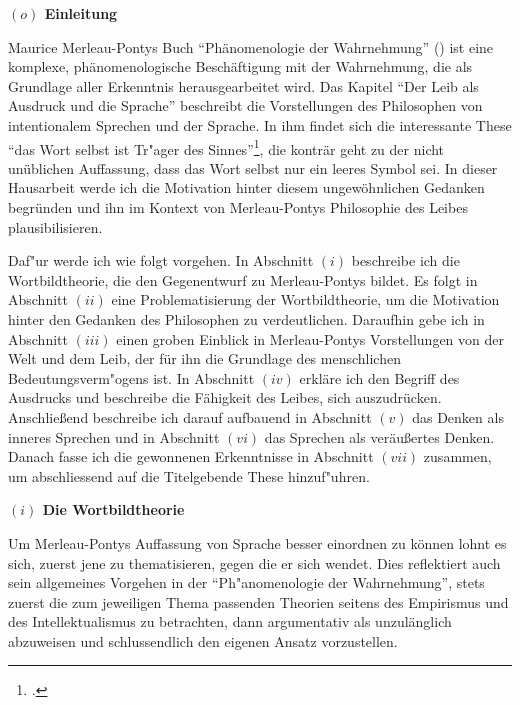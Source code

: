 \documentclass[a4paper, 12pt]{article}
\begin{document}
\begin{onehalfspace} 

\noindent\textbf{$(o)$ Einleitung}

\noindent Maurice Merleau-Pontys Buch "`Phänomenologie der Wahrnehmung"' (\Cite{merleau1966phanomenologie}) ist eine komplexe, phänomenologische Beschäftigung mit der Wahrnehmung, die als Grundlage aller Erkenntnis herausgearbeitet wird. Das Kapitel "`Der Leib als Ausdruck und die Sprache"' beschreibt die Vorstellungen des Philosophen von intentionalem Sprechen und der Sprache. In ihm findet sich die interessante These "`das Wort selbst ist Tr"ager des Sinnes"'\footnote{\Cite[Siehe][S. 211]{merleau1966phanomenologie}.}, die konträr geht zu der nicht unüblichen Auffassung, dass das Wort selbst nur ein leeres Symbol sei. In dieser Hausarbeit werde ich die Motivation hinter diesem ungewöhnlichen Gedanken begründen und ihn im Kontext von Merleau-Pontys Philosophie des Leibes plausibilisieren. 

Daf"ur werde ich wie folgt vorgehen. In Abschnitt $(i)$ beschreibe ich die Wortbildtheorie, die den Gegenentwurf zu Merleau-Pontys bildet. Es folgt in Abschnitt $(ii)$ eine Problematisierung der Wortbildtheorie, um die Motivation hinter den Gedanken des Philosophen zu verdeutlichen. Daraufhin gebe ich in Abschnitt $(iii)$ einen groben Einblick in Merleau-Pontys Vorstellungen von der Welt und dem Leib, der für ihn die Grundlage des menschlichen Bedeutungsverm"ogens ist. In Abschnitt $(iv)$ erkläre ich den Begriff des Ausdrucks und beschreibe die Fähigkeit des Leibes, sich auszudrücken. Anschließend beschreibe ich darauf aufbauend in Abschnitt $(v)$ das Denken als inneres Sprechen und in Abschnitt $(vi)$ das Sprechen als veräußertes Denken. Danach fasse ich die gewonnenen Erkenntnisse in Abschnitt $(vii)$ zusammen, um abschliessend auf die Titelgebende These hinzuf"uhren.

\vspace{5mm}

\noindent\textbf{$(i)$ Die Wortbildtheorie}

\noindent Um Merleau-Pontys Auffassung von Sprache besser einordnen zu können lohnt es sich, zuerst jene zu thematisieren, gegen die er sich wendet. Dies reflektiert auch sein allgemeines Vorgehen in der "`Ph"anomenologie der Wahrnehmung"', stets zuerst die zum jeweiligen Thema passenden Theorien seitens des Empirismus und des Intellektualismus zu betrachten, dann argumentativ als unzulänglich abzuweisen und schlussendlich den eigenen Ansatz vorzustellen. 


\end{onehalfspace}
\end{document}
